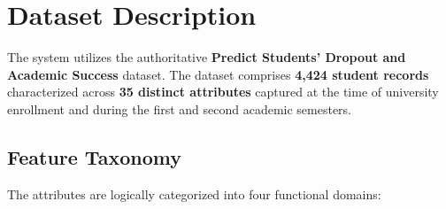 \documentclass[11pt,a4paper]{article}
\begin{document}
\section{Dataset Description}
\label{sec:dataset_description}

The system utilizes the authoritative \textbf{Predict Students' Dropout and Academic Success} dataset. The dataset comprises \textbf{4,424 student records} characterized across \textbf{35 distinct attributes} captured at the time of university enrollment and during the first and second academic semesters.

\subsection{Feature Taxonomy}
The attributes are logically categorized into four functional domains:
\end{document}

